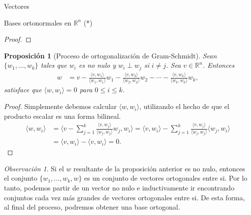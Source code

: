 \documentclass[a4paper,12pt,twoside,spanish,reqno]{amsbook}
\numberwithin{equation}{section}
\newtheorem{proposicion}[teorema]{Proposici\'on}
\theoremstyle{definition}
\theoremstyle{remark}
\newtheorem*{obs*}{Observaci\'on}
\newcommand{\la}{\langle}
\newcommand{\ra}{\rangle}
\newcommand{\R}{\mathbb R}
\begin{document}
\begin{chapter}{Vectores}
\begin{section}{Bases ortonormales en $\R^n$ (*)}
\begin{proof}
    \end{proof}


  
    \begin{proposicion}[Proceso de ortogonalización de Gram-Schmidt]\label{th-gram-scmidt-rn}
        Sean $\{w_1,\ldots,w_k\}$ tales que $w_i$  es no nulo y  $w_i \perp w_j$ si $i\ne j$. Sea $v \in \R^n$. Entonces
        \begin{align*}
         w&= v - \frac{\la v,w_1\ra}{\la w_1,w_1\ra}w_1- \frac{\la v,w_2\ra}{\la w_2,w_2\ra}w_2 - \cdots - \frac{\la v,w_{k}\ra}{\la w_{k},w_{k}\ra}w_{k},
        \end{align*}
        satisface que $\la w, w_i\ra =0$ para $0 \le i \le k$.
    \end{proposicion} 
    \begin{proof}
        Simplemente debemos calcular  $\la w, w_i\ra$,  utilizando el hecho de que el producto escalar es una forma bilineal. 
        \begin{align*}
        \la w, w_i \ra &= \la  v - \sum_{j = 1}^{k} \frac{\la v,w_{j}\ra}{\la w_{j},w_{j}\ra}w_{j} , w_i \ra 
        = \la v, w_i\ra -  \sum_{j = 1}^{k} \frac{\la v,w_{j}\ra}{\la w_{j},w_{j}\ra}\la w_{j} , w_i \ra \\
        &=  \la v, w_i\ra -  \la v, w_i\ra = 0.
        \end{align*}
    \end{proof}

\begin{obs*} Si el $w$  resultante de la proposición anterior es no nulo,  entonces el conjunto  $\{w_1,\ldots,w_k,w\}$ es un conjunto de vectores ortogonales entre si. Por lo tanto, podemos partir de un vector no  nulo e inductivamente ir encontrando  conjuntos cada vez más grandes de vectores ortogonales entre si. De esta forma, al final del proceso, podremos obtener una base ortogonal. 
\end{obs*}



\end{section}
\end{chapter}
\end{document}
